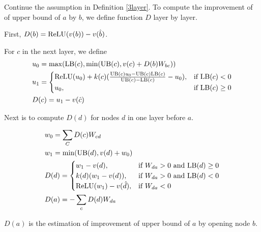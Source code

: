 \begin{definition}
	Continue the assumption in Definition \ref{3layer}. To compute the improvement of of upper bound of $a$ by $b$, we define function $D$ layer by layer.
	
	First, $D(b) = \mathrm{ReLU}(v(b))-v(\hat{b})$.
	
For $c$ in the next layer, we define \begin{align*}
	&u_0 = \max(\mathrm{LB}(c),\min(\mathrm{UB}(c),  v(c)+D(b)W_{bc}))\\
	&u_1 = \begin{cases}
		\mathrm{ReLU}(u_0)+k(c)(\frac{\mathrm{UB}(c)u_0-\mathrm{UB}(c)\mathrm{LB}(c)}{\mathrm{UB}(c)-\mathrm{LB}(c)}-u_0), & \text{if }\mathrm{LB}(c) < 0\\
	u_0, & \text{if }  \mathrm{LB}(c) \geq 0
	\end{cases}\\
	&D(c) = u_1-v(\hat{c})
\end{align*}
	
	Next is to compute $D(d)$ for nodes $d$ in one layer before $a$.
	
	\begin{align*}
		&w_0 = \sum_C D(c)W_{cd}\\
		&w_1 = \min(\mathrm{UB}(d),v(d)+w_0)\\		
		&D(d) =
		\begin{cases}
			w_1-v({d}), & \text{if }W_{da} > 0 \text{ and } \mathrm{LB}(d)\geq 0\\
		k(d)(w_1-v({d})), & \text{if }W_{da} > 0 \text{ and } \mathrm{LB}(d)< 0\\
		\mathrm{ReLU}(w_1)-v(\hat{d})	, & \text{if }  W_{da} < 0
		\end{cases}\\
		&D(a) = -\sum_c D(d)W_{da}
	\end{align*}
\end{definition}$D(a)$ is the estimation of improvement of upper bound of $a$ by opening node $b$. 
		
